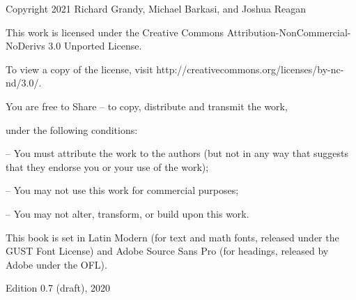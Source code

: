 \documentclass[11pt,fleqn,twoside,openright]{report}%
\begin{document}
\setcounter{page}{1}%
\pagestyle{empty}

\vspace*{.8in}


\vspace{1.25in}

\vspace*{12pt}

\vspace*{12pt}

\vfill
\noindent{\LARGE{}\sffamily\selectfont{}{Draft 0.71}} %

\newpage
\pagestyle{empty}

\vspace*{.25in}
{\small 
\noindent{}Copyright \textcopyright{} 2021 Richard Grandy, Michael Barkasi, and Joshua Reagan

\bigskip
\noindent{}This work is licensed under the Creative Commons Attribution-NonCommercial-NoDerivs 3.0 Unported License. 

\noindent{}To view a copy of the license, visit http://creativecommons.org/licenses/by-nc-nd/3.0/.

\bigskip
\noindent{}You are free {to Share} -- to copy, distribute and transmit the work, 

\noindent{}under the following conditions: 

 -- You must attribute the work to the authors (but not in any way that suggests that they endorse you or your use of the work); 

 -- You may not use this work for commercial purposes;

 -- You may not alter, transform, or build upon this work.

\vfill
\noindent{}This book is set in Latin Modern (for text and math fonts, released under the GUST Font License) and Adobe Source Sans Pro (for headings, released by Adobe under the OFL). 

\bigskip
\noindent{}Edition 0.7 (draft), 2020
}
\end{document}
